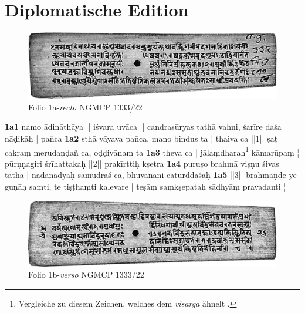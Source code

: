 \documentclass[a4paper,12pt]{article}
\begin{document}
\section{Diplomatische Edition}
\label{diped}
{\fontsize{11pt}{13}\selectfont
\begin{figure}[htbp] 
  \centering
     \includegraphics[width=1\textwidth]{1r.jpg}
  \caption{Folio 1a-\textit{recto} NGMCP 1333/22}
  \label{fig:Folio1a}
\end{figure}

\begin{flushleft}
\noindent
\textbf{1a1}  namo ādināthāya || iśvara uvāca || candrasūryas tathā vahni, śarīre daśa nāḍikāḥ | pañca \linebreak
\textbf{1a2} sthā vāyava pañca, mano bindus ta ¦  thaiva ca ||1|| ṣaṭ cakraṃ merudaṇḍañ ca, oḍḍiyānaṃ ta \linebreak
\textbf{1a3} theva ca | jālaṃdharaḥ\footnote{Vergleiche zu diesem Zeichen, welches dem \textit{visarga} ähnelt \parencite[18]{arbor2012}.} kāmarūpaṃ ¦  pūrṇṇagiri śrīhattakaḥ ||2|| prakīrttiḥ kṣetra \linebreak
\textbf{1a4} puruṣo brahmā viṣṇu śivas tathā |  nadānadyaḥ samudrāś ca, bhuvanāni caturddaśaḥ \linebreak
\textbf{1a5} ||3|| brahmāṇḍe ye guṇāḥ saṃti, te tiṣṭhaṃti kalevare | teṣāṃ saṃkṣepataḥ sādhyāṃ pravadanti ¦ \linebreak 
\end{flushleft}

\begin{figure}[htbp] 
  \centering
     \includegraphics[width=1\textwidth]{1v.jpg}
  \caption{Folio 1b-\textit{verso} NGMCP 1333/22}
  \label{fig:Folio1b}
\end{figure}

}
\end{document}
